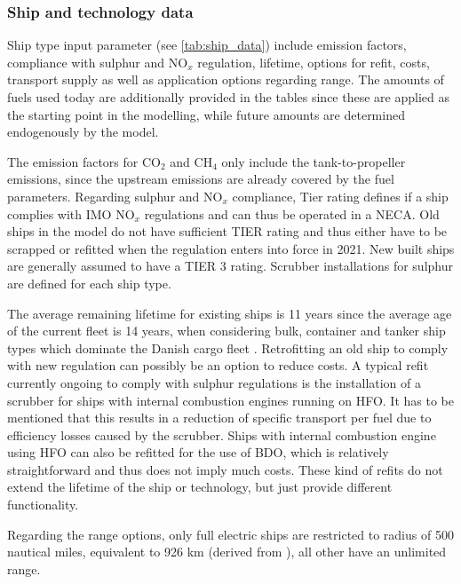 \documentclass[article]{elsarticle}
\begin{document}
\subsubsection{Ship and technology data}
Ship type input parameter (see \autoref{tab:ship_data}) include emission factors, compliance with sulphur and NO$_x$ regulation, lifetime, options for refit, costs, transport supply as well as application options regarding range. The amounts of fuels used today are additionally provided in the tables since these are applied as the starting point in the modelling, while future amounts are determined endogenously by the model.

The emission factors for CO$_2$ and CH$_4$ only include the tank-to-propeller emissions, since the upstream emissions are already covered by the fuel parameters. Regarding sulphur and NO$_x$ compliance, Tier rating defines if a ship complies with IMO NO$_x$ regulations and can thus be operated in a NECA. Old ships in the model do not have sufficient TIER rating and thus either have to be scrapped or refitted when the regulation enters into force in 2021. New built ships are generally assumed to have a TIER 3 rating. Scrubber installations for sulphur are defined for each ship type.

The average remaining lifetime for existing ships is 11 years since the average age of the current fleet is 14 years, when considering bulk, container and tanker ship types which dominate the Danish cargo fleet \cite[Tab.~2.2, p.~27]{UNCTAD2017}. Retrofitting an old ship to comply with new regulation can possibly be an option to reduce costs. A typical refit currently ongoing to comply with sulphur regulations is the installation of a scrubber for ships with internal combustion engines running on HFO. It has to be mentioned that this results in a reduction of specific transport per fuel due to efficiency losses caused by the scrubber. Ships with internal combustion engine using HFO can also be refitted for the use of BDO, which is relatively straightforward and thus does not imply much costs. These kind of refits do not extend the lifetime of the ship or technology, but just provide different functionality.

Regarding the range options, only full electric ships are restricted to radius of 500 nautical miles, equivalent to 926 km (derived from \cite{Stensvold2018a}), all other have an unlimited range.
\end{document}
